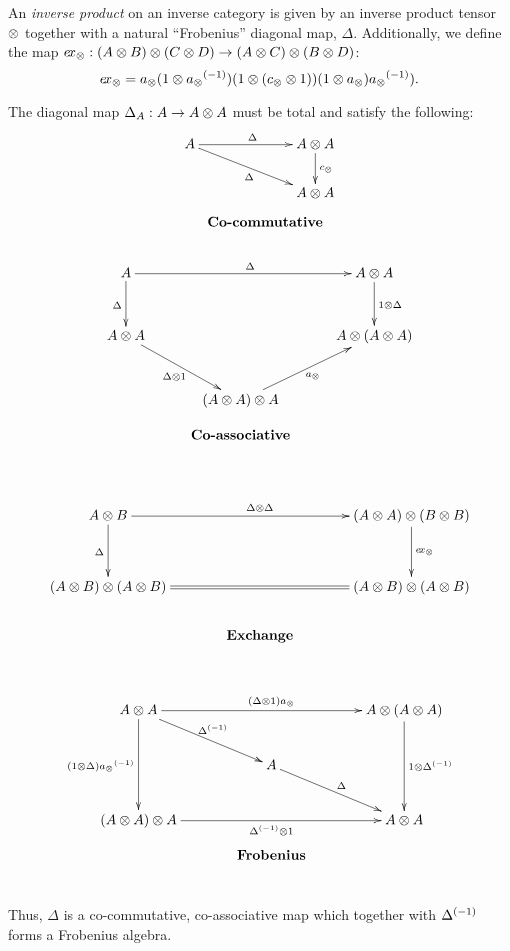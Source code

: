 \begin{definition}\label{def:inverse_product}
  An \emph{inverse product} on an inverse category \X is given by an inverse product tensor $\otimes$
  together with a  natural ``Frobenius'' diagonal map, $\Delta$. Additionally, we define the
  map $e\!x_{\otimes}: (A\otimes B)\otimes(C\otimes D) \to (A\otimes C) \otimes (B\otimes D)$:
  \[
    e\!x_{\otimes} =  a_{\otimes}(1\otimes{a_{\otimes}}^{(-1)})(1\otimes(c_{\otimes}\otimes1))(1\otimes a_{\otimes}){a_{\otimes}}^{(-1)}).
  \]

  The diagonal map $\Delta_A:A \to A\otimes A$ must be total and satisfy the following:
  \[
    \xymatrix @!0 @C=90pt @R=35pt{
      A \ar[dr]_{\Delta} \ar[r]^{\Delta} &
      A \* A \ar[d]^{c_{\*}}\\
      & A \* A\\
      &*!<3pc,-15pt>{\text{\textbf{Co-commutative}}}
    }
  \]
  \[
    \xymatrix @C=30pt @R=30pt{
      A \ar[rr]^{\Delta} \ar[d]_{\Delta} & &
      A \* A \ar[d]^{1\*\Delta}\\
      A\*A \ar[dr]_{\Delta \* 1}& & A \* ( A \* A) \\
      &   (A \* A) \* A \ar[ur]_{a_{\*}}\\
      &*!<0pc,-35pt>{\text{\textbf{Co-associative}}}
    }
  \]
  \[
    \xymatrix @C=40pt @R=35pt{
      A \* B \ar[d]_{\Delta}
      \ar[rr]^{\Delta \* \Delta} & &
      (A \* A) \* (B \* B) \ar[d]^{\excs}\\
      (A \* B) \* (A \* B) \ar@{=}[rr] & &
      (A \* B) \* (A \* B)\\
      &*!<0pc,-25pt>{\text{\textbf{Exchange}}}
    }
  \]

  \[
    \xymatrix @C=40pt @R=25pt{
      A \* A \ar[dd]_{(1\*\Delta) \inv{a_{\*}}} \ar[dr]^{\inv{\Delta}}
      \ar[rr]^{(\Delta \* 1) a_{\*}} & &
      A \* (A \* A) \ar[dd]^{1 \* \inv{\Delta}}\\
      & A \ar[dr]^{\Delta} & \\
      (A \* A) \* A \ar[rr]_{\inv{\Delta} \* 1} & &
      A \* A\\
      &*!<0pc,-25pt>{\text{\textbf{Frobenius}}}
    }
  \]
  Thus, $\Delta$ is a co-commutative, co-associative map which together with ${\Delta}^{(-1)}$ forms a
  Frobenius algebra.
\end{definition}


